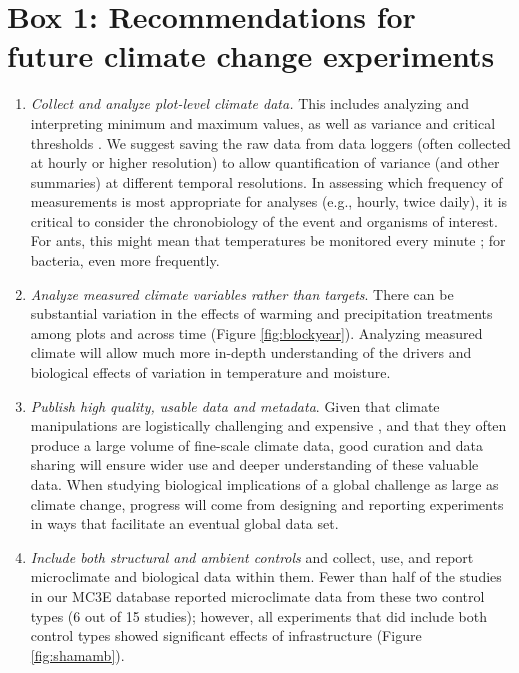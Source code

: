 \documentclass{article}
\begin{document}
\section* {Box 1: Recommendations for future climate change experiments} 
\begin{enumerate}
\item\textit{Collect and analyze plot-level climate data.} This includes analyzing and interpreting minimum and maximum values, as well as variance and critical thresholds \citep[e.g., the number and duration of freeze-thaw events and accumulated chilling hours,][]{mcdaniel2014,vasseur2014}. We suggest saving the raw data from data loggers (often collected at hourly or higher resolution) to allow quantification of variance (and other summaries) at different temporal resolutions. In assessing which frequency of measurements is most appropriate for analyses (e.g., hourly, twice daily), it is critical to consider the chronobiology of the event and organisms of interest. For ants, this might mean that temperatures be monitored every minute \citep{shavit2017}; for bacteria, even more frequently. 
\item\textit{Analyze measured climate variables rather than targets}. There can be substantial variation in the effects of warming and precipitation treatments among plots and across time (Figure \ref{fig:blockyear}). Analyzing measured climate will allow much more in-depth understanding of the drivers and biological effects of variation in temperature and moisture.
\item\textit{Publish high quality, usable data and metadata}. Given that climate manipulations are logistically challenging and expensive \citep{aronson2009}, and that they often produce a large volume of fine-scale climate data, good curation and data sharing will ensure wider use and deeper understanding of these valuable data. When studying biological implications of a global challenge as large as climate change, progress will come from designing and reporting experiments in ways that facilitate an eventual global data set. %
\item\textit{Include both structural and ambient controls} and collect, use, and report microclimate and biological data within them. Fewer than half of the studies in our MC3E database reported microclimate data from these two control types (6 out of 15 studies); however, all experiments that did include both control types showed significant effects of infrastructure (Figure \ref{fig:shamamb}). %

\end{enumerate}
\end{document}
